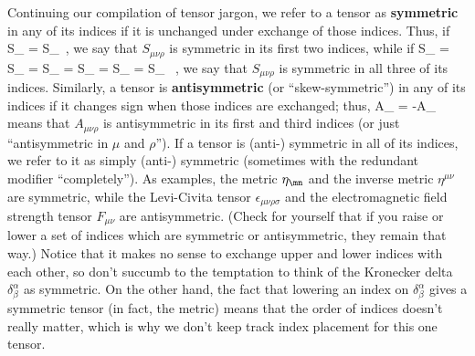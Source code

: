 Continuing our compilation of tensor jargon, we refer to a tensor as
{\bf symmetric} in any of its indices if it is unchanged under exchange
of those indices.  Thus, if 
\be
  S_{\mu\nu\rho} = S_{\nu\mu\rho}\ ,\label{1.64}
\ee
we say that $S_{\mu\nu\rho}$ is symmetric in its first two indices, while
if
\be
  S_{\mu\nu\rho} = S_{\mu\rho\nu} = S_{\rho\mu\nu} = S_{\nu\mu\rho}
  = S_{\nu\rho\mu} = S_{\rho\nu\mu} \ ,\label{1.65}
\ee
we say that $S_{\mu\nu\rho}$ is symmetric in all three of its indices.
Similarly, a tensor is {\bf antisymmetric} (or ``skew-symmetric'') in
any of its indices if it changes sign when those indices are exchanged;
thus,
\be
  A_{\mu\nu\rho} = -A_{\rho\nu\mu}\label{1.66}
\ee
means that $A_{\mu\nu\rho}$ is antisymmetric in its first and third
indices (or just ``antisymmetric in $\mu$ and $\rho$'').  If a tensor
is (anti-) symmetric in all of its indices, we refer to it as simply
(anti-) symmetric (sometimes with the redundant modifier ``completely'').  
As examples, the metric $\eta_{\mn}$ and the inverse
metric $\eta^{\mu\nu}$ are symmetric, while the Levi-Civita tensor
$\epsilon_{\mu\nu\rho\sigma}$ and the electromagnetic field strength
tensor $F_{\mu\nu}$ are antisymmetric.  (Check for yourself that if you
raise or lower a set of indices which are symmetric or antisymmetric,
they remain that way.)  Notice that it makes no sense to exchange upper
and lower indices with each other, so don't succumb to the temptation
to think of the Kronecker delta $\delta^\alpha_\beta$ as symmetric.
On the other hand, the fact that lowering an index on $\delta^\alpha_\beta$
gives a symmetric tensor (in fact, the metric) means that the order of
indices doesn't really matter, which is why we don't keep track index
placement for this one tensor.

